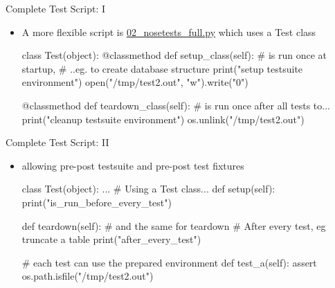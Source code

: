 \begin{pyframe}{Complete Test Script: I}
\begin{itemize}
\item A more flexible script is \href{https://github.com/ioggstream/python-course/blob/master/python-for-sysadmin/02\_nosetests\_full.py}{02\_nosetests\_full.py}
which uses a Test class
\begin{pycode}
class Test(object):
    @classmethod
    def setup_class(self): # is run once at startup, 
        # ..eg. to create database structure
        print("setup testsuite environment")
        open("/tmp/test2.out", "w").write("0")

    @classmethod
    def teardown_class(self): # is run once after all tests to...
        print("cleanup testsuite environment")
        os.unlink("/tmp/test2.out")

 
\end{pycode} 
\end{itemize}
\end{pyframe}

\begin{pyframe}{Complete Test Script: II}
\begin{itemize}
\item allowing pre-post testsuite and pre-post test fixtures
\begin{pycode}
class Test(object):
    ...
    # Using a Test class...
    def setup(self): 
        print("is_run_before_every_test")

    def teardown(self): # and the same for teardown
        # After every test, eg truncate a table
        print("after_every_test")

    # each test can use the prepared environment
    def test_a(self): 
        assert os.path.isfile("/tmp/test2.out")
 
\end{pycode}
\end{itemize}
\end{pyframe}
